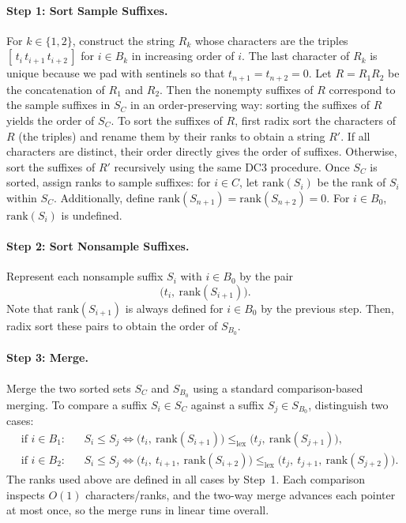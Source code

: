 \paragraph{Step 1: Sort Sample Suffixes.}
For $k \in \{1,2\}$, construct the string $R_k$ whose characters are the triples $[\,t_i\, t_{i+1}\, t_{i+2}\,]$ for $i \in B_k$ in increasing order of $i$. The last character of $R_k$ is unique because we pad with sentinels so that $t_{n+1} = t_{n+2} = 0$. Let $R = R_1 R_2$ be the concatenation of $R_1$ and $R_2$.
Then the nonempty suffixes of $R$ correspond to the sample suffixes in $S_C$ in an order-preserving way: sorting the suffixes of $R$ yields the order of $S_C$.
To sort the suffixes of $R$, first radix sort the characters of $R$ (the triples) and rename them by their ranks to obtain a string $R'$. If all characters are distinct, their order directly gives the order of suffixes. Otherwise, sort the suffixes of $R'$ recursively using the same DC3 procedure.
Once $S_C$ is sorted, assign ranks to sample suffixes: for $i \in C$, let $\mathrm{rank}(S_i)$ be the rank of $S_i$ within $S_C$. Additionally, define $\mathrm{rank}(S_{n+1}) = \mathrm{rank}(S_{n+2}) = 0$. For $i \in B_0$, $\mathrm{rank}(S_i)$ is undefined.

\paragraph{Step 2: Sort Nonsample Suffixes.}
Represent each nonsample suffix $S_i$ with $i \in B_0$ by the pair
\[
\bigl(t_i,\ \mathrm{rank}(S_{i+1})\bigr).
\]
Note that $\mathrm{rank}(S_{i+1})$ is always defined for $i \in B_0$ by the previous step. Then, radix sort these pairs to obtain the order of $S_{B_0}$.

\paragraph{Step 3: Merge.}
Merge the two sorted sets $S_C$ and $S_{B_0}$ using a standard comparison-based merging. To compare a suffix $S_i \in S_C$ against a suffix $S_j \in S_{B_0}$, distinguish two cases:
\[
\begin{aligned}
&\text{if } i \in B_1: && S_i \le S_j \iff \bigl(t_i,\ \mathrm{rank}(S_{i+1})\bigr) \le_{\mathrm{lex}} \bigl(t_j,\ \mathrm{rank}(S_{j+1})\bigr),\\
&\text{if } i \in B_2: && S_i \le S_j \iff \bigl(t_i,\ t_{i+1},\ \mathrm{rank}(S_{i+2})\bigr) \le_{\mathrm{lex}} \bigl(t_j,\ t_{j+1},\ \mathrm{rank}(S_{j+2})\bigr).
\end{aligned}
\]
The ranks used above are defined in all cases by Step~1. Each comparison inspects $O(1)$ characters/ranks, and the two-way merge advances each pointer at most once, so the merge runs in linear time overall.

